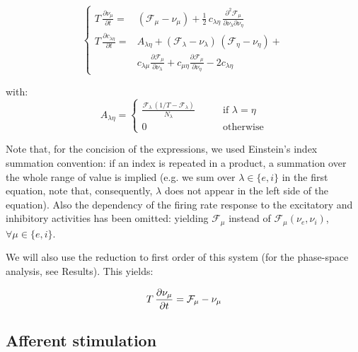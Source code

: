 \documentclass[8pt, colorlinks, a4paper]{article}
\begin{document}
\begin{equation}
  \label{eq:master-equation}
  \left\{
    \begin{split}
      T \, \frac{\partial \nu_\mu}{\partial t} = & (\mathcal{F}_\mu -
      \nu_\mu ) + \frac{1}{2} \, c_{\lambda \eta} \,
      \frac{\partial^2 \mathcal{F}_\mu}{\partial \nu_\lambda \partial \nu_\eta} \\
      T \, \frac{\partial c_{\lambda \eta} }{\partial t} = &
      A_{\lambda \eta} +
      (\mathcal{F}_\lambda - \nu_\lambda ) \, (\mathcal{F}_\eta - \nu_\eta ) + \\
      & c_{\lambda \mu} \frac{\partial \mathcal{F}_\mu}{\partial
        \nu_\lambda} + c_{\mu \eta} \frac{\partial
        \mathcal{F}_\mu}{\partial \nu_\eta} - 2 c_{\lambda \eta}
    \end{split}
  \right.
\end{equation}

with:
\begin{equation}
  A_{\lambda \eta} =  
  \left\{
    \begin{split}
      \frac{\mathcal{F}_\lambda \, (1/T -
        \mathcal{F}_\lambda)}{N_\lambda}
      \qquad & \textrm{if  } \lambda=\eta \\
      0 \qquad & \textrm{otherwise}
    \end{split}
  \right.
\end{equation}

Note that, for the concision of the expressions, we used Einstein's
index summation convention: if an index is repeated in a product, a
summation over the whole range of value is implied (e.g. we sum over
\(\lambda \in \{e,i\} \) in the first equation, note that,
consequently, \(\lambda\) does not appear in the left side of the
equation). Also the dependency of the firing rate response to the
excitatory and inhibitory activities has been omitted: yielding
\(\mathcal{F}_\mu\) instead of \(\mathcal{F}_\mu(\nu_e,\nu_i)\),
\(\forall \mu \in \{e,i\} \).

We will also use the reduction to first order of this system (for the
phase-space analysis, see Results). This yields:

\begin{equation}
  \label{eq:master-eq-1st-order}
  T \, \frac{\partial \nu_\mu}{\partial t} = \mathcal{F}_\mu - \nu_\mu \\
\end{equation}

\subsection{Afferent stimulation}
\label{sec-3-8}
\end{document}
